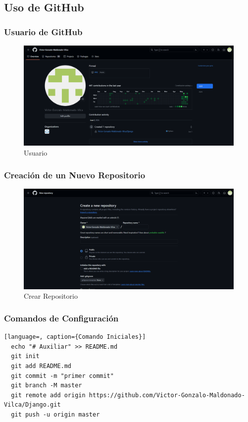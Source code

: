 \documentclass{article}
\begin{document}
  \subsection{Uso de GitHub}
  

	\subsubsection{Usuario de GitHub}
  \begin{figure}[H]
    \centering
    \includegraphics[width=1\textwidth, keepaspectratio]{img/usuario.png}
    \caption{Usuario}
  \end{figure}
  \newpage
  

  \subsubsection{Creación de un Nuevo Repositorio}
  \begin{figure}[H]
    \centering
    \includegraphics[width=1\textwidth, keepaspectratio]{img/crear.png}
    \caption{Crear Repositorio}
  \end{figure}
  
	
  \subsubsection{Comandos de Configuración}
  \begin{lstlisting}[language=, caption={Comando Iniciales}]
  echo "# Auxiliar" >> README.md
  git init
  git add README.md
  git commit -m "primer commit"
  git branch -M master
  git remote add origin https://github.com/Victor-Gonzalo-Maldonado-Vilca/Django.git
  git push -u origin master
  \end{lstlisting}
  \newpage
  
\end{document}
